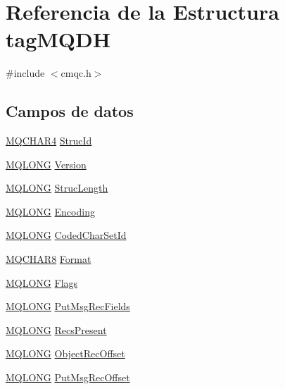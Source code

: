 \hypertarget{structtag_m_q_d_h}{}\section{Referencia de la Estructura tag\+M\+Q\+D\+H}
\label{structtag_m_q_d_h}


{\ttfamily \#include $<$cmqc.\+h$>$}

\subsection*{Campos de datos}
\begin{DoxyCompactItemize}
\item 
\hyperlink{cmqc_8h_a12590e546ed66fda7cf21c1d5cefa31d}{M\+Q\+C\+H\+A\+R4} \hyperlink{structtag_m_q_d_h_a0530922ca944569b52601d74941f96e4}{Struc\+Id}
\item 
\hyperlink{cmqc_8h_a1fb8d28cbda3fa8766a9821230cdb6d5}{M\+Q\+L\+O\+N\+G} \hyperlink{structtag_m_q_d_h_a0656ef8f766b3907d394d88a35d7b7e9}{Version}
\item 
\hyperlink{cmqc_8h_a1fb8d28cbda3fa8766a9821230cdb6d5}{M\+Q\+L\+O\+N\+G} \hyperlink{structtag_m_q_d_h_a830af9a4a08c015b9a4b2d39d4d3420a}{Struc\+Length}
\item 
\hyperlink{cmqc_8h_a1fb8d28cbda3fa8766a9821230cdb6d5}{M\+Q\+L\+O\+N\+G} \hyperlink{structtag_m_q_d_h_a30167bf454a49a60fd3fe4e9e586af34}{Encoding}
\item 
\hyperlink{cmqc_8h_a1fb8d28cbda3fa8766a9821230cdb6d5}{M\+Q\+L\+O\+N\+G} \hyperlink{structtag_m_q_d_h_a4d8d1961a991850d1355cdf9b4680b8e}{Coded\+Char\+Set\+Id}
\item 
\hyperlink{cmqc_8h_abddcedb8c41fa262f2bd05dfec3e60a5}{M\+Q\+C\+H\+A\+R8} \hyperlink{structtag_m_q_d_h_a435a478822008713f8aaff89f369ed63}{Format}
\item 
\hyperlink{cmqc_8h_a1fb8d28cbda3fa8766a9821230cdb6d5}{M\+Q\+L\+O\+N\+G} \hyperlink{structtag_m_q_d_h_a8da770267273b200fa9c968fa2a0da57}{Flags}
\item 
\hyperlink{cmqc_8h_a1fb8d28cbda3fa8766a9821230cdb6d5}{M\+Q\+L\+O\+N\+G} \hyperlink{structtag_m_q_d_h_aea1b77e1a6f2b6f18526055315f8b175}{Put\+Msg\+Rec\+Fields}
\item 
\hyperlink{cmqc_8h_a1fb8d28cbda3fa8766a9821230cdb6d5}{M\+Q\+L\+O\+N\+G} \hyperlink{structtag_m_q_d_h_a7592da03e0f1c9bc79c9dd4e641dcf73}{Recs\+Present}
\item 
\hyperlink{cmqc_8h_a1fb8d28cbda3fa8766a9821230cdb6d5}{M\+Q\+L\+O\+N\+G} \hyperlink{structtag_m_q_d_h_a8ec0fdf14ab5b4d0f7caf7f333dfbeb4}{Object\+Rec\+Offset}
\item 
\hyperlink{cmqc_8h_a1fb8d28cbda3fa8766a9821230cdb6d5}{M\+Q\+L\+O\+N\+G} \hyperlink{structtag_m_q_d_h_a49f55d9686cdc9c051e09950fede2098}{Put\+Msg\+Rec\+Offset}
\end{DoxyCompactItemize}


